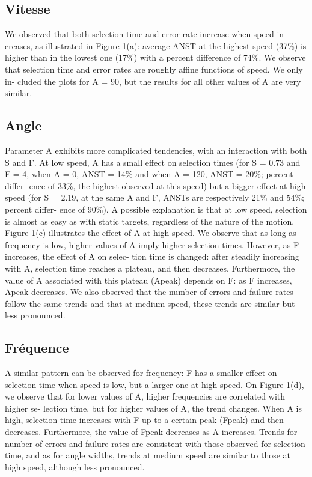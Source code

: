 	\subsection{Vitesse}
	We observed that both selection time and error rate increase when speed in-
creases, as illustrated in Figure 1(a): average ANST at the highest speed (37\%{}) is
higher than in the lowest one (17\%{}) with a percent difference of 74\%{}. We observe
that selection time and error rates are roughly affine functions of speed. We only in-
cluded the plots for A = 90, but the results for all other values of A are very similar.

	\subsection{Angle}
	Parameter A exhibits more complicated tendencies, with an interaction with
both S and F. At low speed, A has a small effect on selection times (for S = 0.73 and
F = 4, when A = 0, ANST = 14\%{} and when A = 120, ANST = 20\%{}; percent differ-
ence of 33\%{}, the highest observed at this speed) but a bigger effect at high speed (for
S = 2.19, at the same A and F, ANSTs are respectively 21\%{} and 54\%{}; percent differ-
ence of 90\%{}). A possible explanation is that at low speed, selection is almost as easy
as with static targets, regardless of the nature of the motion. Figure 1(c) illustrates the
effect of A at high speed. We observe that as long as frequency is low, higher values
of A imply higher selection times. However, as F increases, the effect of A on selec-
tion time is changed: after steadily increasing with A, selection time reaches a plateau,
and then decreases. Furthermore, the value of A associated with this plateau (Apeak)
depends on F: as F increases, Apeak decreases.
We also observed that the number of errors and failure rates follow the same trends
and that at medium speed, these trends are similar but less pronounced.

	\subsection{Fréquence}
	A similar pattern can be observed for frequency: F has a smaller effect on
selection time when speed is low, but a larger one at high speed. On Figure 1(d), we
observe that for lower values of A, higher frequencies are correlated with higher se-
lection time, but for higher values of A, the trend changes. When A is high, selection
time increases with F up to a certain peak (Fpeak) and then decreases. Furthermore, the
value of Fpeak decreases as A increases. Trends for number of errors and failure rates
are consistent with those observed for selection time, and as for angle widths, trends
at medium speed are similar to those at high speed, although less pronounced.


